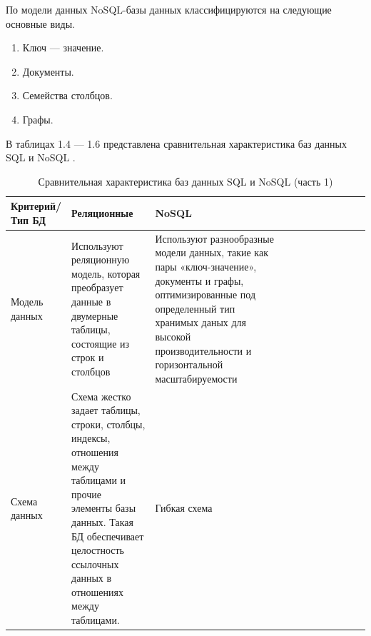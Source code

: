  По модели данных NoSQL-базы данных классифицируются на следующие основные виды.
\begin{enumerate}
\item Ключ — значение.
\item Документы.
\item Семейства столбцов.
\item Графы.
\end{enumerate}

 В таблицах 1.4 --- 1.6 представлена сравнительная характеристика баз данных SQL и NoSQL \cite{AMNOSQL}.

\clearpage 

\begin{table}[h]
\caption{Сравнительная характеристика баз данных SQL и NoSQL (часть 1)}
\begin{center}
\begin{tabular}{|l|p{0.25\linewidth}|p{0.41\linewidth}|p{0.35\linewidth}|}
		\hline
		Критерий/Тип БД & Реляционные & NoSQL \\ [0.5ex] 
 		\hline
		 Модель данных & Используют реляционную модель, которая преобразует данные в двумерные таблицы, состоящие из строк и столбцов & Используют разнообразные модели данных, такие как пары «ключ-значение», документы и графы, оптимизированные под определенный тип хранимых даных для высокой производительности и горизонтальной масштабируемости\\
 		\hline 
		Схема данных & Схема жестко задает таблицы, строки, столбцы, индексы, отношения между таблицами и прочие элементы базы данных. Такая БД обеспечивает целостность ссылочных данных в отношениях между таблицами. & Гибкая схема\\
 		\hline
 \end{tabular}
\end{center}
\end{table}

\clearpage

